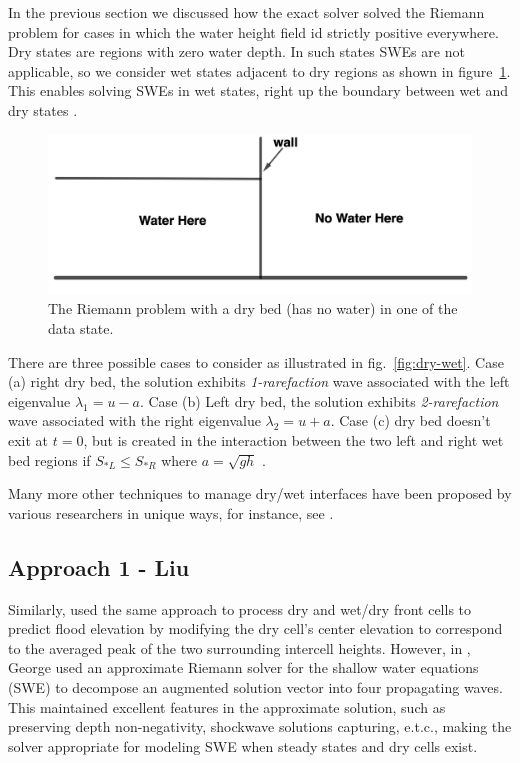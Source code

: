 \documentclass[11pt,a4paper]{article}
\begin{document}
	In the previous section we discussed how the exact solver solved the Riemann problem for cases in which the water height field id strictly positive everywhere. Dry states are regions with zero water depth. In such states SWEs are not applicable, so we consider wet states adjacent to dry regions as shown in figure~\ref{fig:dry-bed}. This enables solving SWEs in wet states, right up the boundary between wet and dry states \citep{toro2001shock}.
	\begin{figure}[H]
		\centering
		\includegraphics[width=0.5\linewidth]{images/dd1}
		\caption{ The Riemann problem with a dry bed (has no water) in one of the data state. }
		\label{fig:dry-bed}
	\end{figure}
	There are three possible cases to consider as illustrated in fig.~\ref{fig:dry-wet}. Case (a) right dry bed, the solution exhibits {\em 1-rarefaction} wave associated with the left eigenvalue $\lambda_1 = u - a$. Case (b) Left dry bed, the solution exhibits {\em 2-rarefaction} wave associated with the right eigenvalue $\lambda_2 = u + a$. Case (c) dry bed doesn't exit at $t=0$, but is created in the interaction between the two left and right wet bed regions if $S_{*L} \le S_{*R}$ where $a = \sqrt{gh}$ \cite{toro2001shock}.
	

Many more other techniques to manage dry/wet interfaces have been proposed by various researchers in unique ways, for instance, see \citet{po:2015, po:2018, pe-bo-ma:2011, toro2001shock, chaabelasri1849simple,nikolos2009unstructured,huang2013well,fivser2016mass, bi2014finite,song2011unstructured,buttinger2019fast}.


	\subsection{Approach 1 - Liu}
					Similarly, \citet{li-ta-wa-ca-ba-ch-li:2021} used the same approach to process dry and wet/dry front cells to predict flood elevation by modifying the dry cell's center elevation to correspond to the averaged peak of the two surrounding intercell heights. However, in \cite{ge:2008}, George used an approximate Riemann solver for the shallow water equations (SWE) to decompose an augmented solution vector into four propagating waves. This maintained excellent features in the approximate solution, such as preserving depth non-negativity, shockwave solutions capturing, e.t.c., making the solver appropriate for modeling SWE when steady states and dry cells exist.
\end{document}
